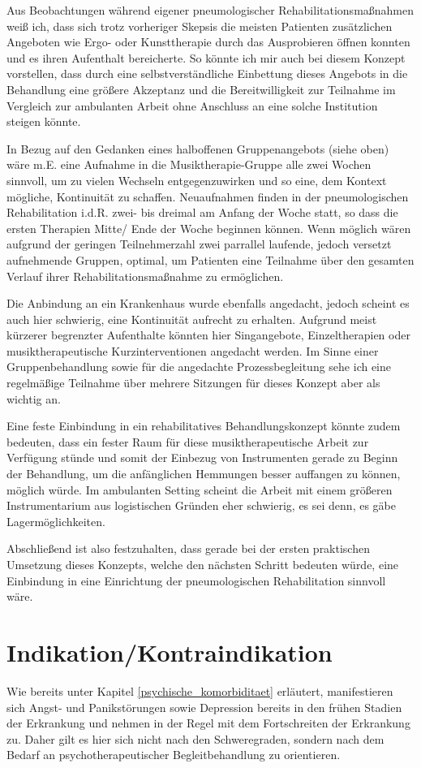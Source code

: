 Aus Beobachtungen während eigener pneumologischer Rehabilitationsmaßnahmen weiß ich, dass sich trotz vorheriger Skepsis die meisten Patienten zusätzlichen Angeboten wie Ergo- oder Kunsttherapie durch das Ausprobieren öffnen konnten und es ihren Aufenthalt bereicherte. So könnte ich mir auch bei diesem Konzept vorstellen, dass durch eine selbstverständliche Einbettung dieses Angebots in die Behandlung eine größere Akzeptanz und die Bereitwilligkeit zur Teilnahme im Vergleich zur ambulanten Arbeit ohne Anschluss an eine solche Institution steigen könnte. 

In Bezug auf den Gedanken eines halboffenen Gruppenangebots (siehe oben) wäre m.E. eine Aufnahme in die Musiktherapie-Gruppe alle zwei Wochen sinnvoll, um zu vielen Wechseln entgegenzuwirken und so eine, dem Kontext mögliche, Kontinuität zu schaffen. Neuaufnahmen finden in der pneumologischen Rehabilitation i.d.R. zwei- bis dreimal am Anfang der Woche statt, so dass die ersten Therapien Mitte/ Ende der Woche beginnen können. Wenn möglich wären aufgrund der geringen Teilnehmerzahl zwei parrallel laufende, jedoch versetzt aufnehmende Gruppen, optimal, um Patienten eine Teilnahme über den gesamten Verlauf ihrer Rehabilitationsmaßnahme zu ermöglichen.

Die Anbindung an ein Krankenhaus wurde ebenfalls angedacht, jedoch scheint es auch hier schwierig, eine Kontinuität aufrecht zu erhalten. Aufgrund meist kürzerer begrenzter Aufenthalte könnten hier Singangebote, Einzeltherapien oder musiktherapeutische Kurzinterventionen angedacht werden. Im Sinne einer Gruppenbehandlung sowie für die angedachte Prozessbegleitung sehe ich eine regelmäßige Teilnahme über mehrere Sitzungen für dieses Konzept aber als wichtig an. 

Eine feste Einbindung in ein rehabilitatives Behandlungskonzept könnte zudem bedeuten, dass ein fester Raum für diese musiktherapeutische Arbeit zur Verfügung stünde und somit der Einbezug von Instrumenten gerade zu Beginn der Behandlung, um die anfänglichen Hemmungen besser auffangen zu können, möglich würde. Im ambulanten Setting scheint die Arbeit mit einem größeren Instrumentarium aus logistischen Gründen eher schwierig, es sei denn, es gäbe Lagermöglichkeiten.

Abschließend ist also festzuhalten, dass gerade bei der ersten praktischen Umsetzung dieses Konzepts, welche den nächsten Schritt bedeuten würde, eine Einbindung in eine Einrichtung der pneumologischen Rehabilitation sinnvoll wäre.

\section{Indikation/Kontraindikation}
Wie bereits unter Kapitel \ref{psychische_komorbiditaet} erläutert, manifestieren sich Angst- und Panikstörungen sowie Depression bereits in den frühen Stadien der Erkrankung und nehmen in der Regel mit dem Fortschreiten der Erkrankung zu. Daher gilt es hier sich nicht nach den Schweregraden, sondern nach dem Bedarf an psychotherapeutischer Begleitbehandlung zu orientieren. 

